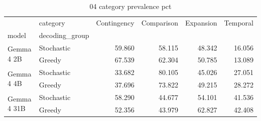 \begin{table}
\caption{04 category prevalence pct}
\begin{tabular}{llrrrr}
\toprule
 & category & Contingency & Comparison & Expansion & Temporal \\
model & decoding_group &  &  &  &  \\
\midrule
\multirow[t]{2}{*}{Gemma 4 2B} & Stochastic & 59.860 & 58.115 & 48.342 & 16.056 \\
 & Greedy & 67.539 & 62.304 & 50.785 & 13.089 \\
\cline{1-6}
\multirow[t]{2}{*}{Gemma 4 4B} & Stochastic & 33.682 & 80.105 & 45.026 & 27.051 \\
 & Greedy & 37.696 & 73.822 & 49.215 & 28.272 \\
\cline{1-6}
\multirow[t]{2}{*}{Gemma 4 31B} & Stochastic & 58.290 & 44.677 & 54.101 & 41.536 \\
 & Greedy & 52.356 & 43.979 & 62.827 & 42.408 \\
\cline{1-6}
\bottomrule
\end{tabular}
\end{table}
